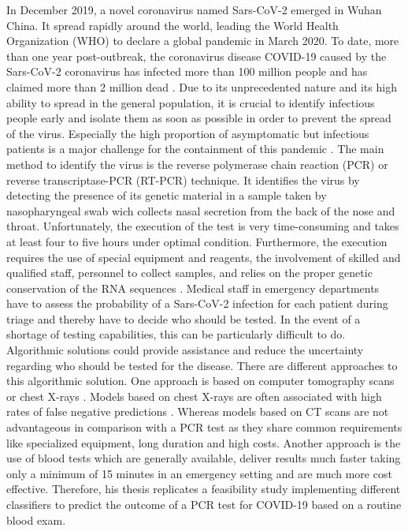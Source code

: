 In December 2019, a novel coronavirus named Sars-CoV-2 emerged in Wuhan China. 
It spread rapidly around the world, leading the World Health Organization (WHO) 
to declare a global pandemic in March 2020. To date, more than one year 
post-outbreak, the coronavirus disease COVID-19 caused by the Sars-CoV-2 
coronavirus has infected more than 100 million people and has claimed more than 
2 million dead \cite{RN204}. Due to its unprecedented nature and its high 
ability to spread in the general population, it is crucial to identify 
infectious people early and isolate them as soon as possible in order to 
prevent the spread of the virus. Especially the high proportion of asymptomatic 
but infectious patients is a major challenge for the containment of this 
pandemic \cite{RN205}. The main method to identify the virus is the reverse 
polymerase chain reaction (PCR) or reverse transcriptase-PCR (RT-PCR) 
technique. It identifies the virus by detecting the presence of its genetic 
material in a sample taken by nasopharyngeal swab wich collects nasal 
secretion from the back of the nose and throat. Unfortunately, the execution of 
the test is very time-consuming and takes at least four to five hours under 
optimal condition. 
Furthermore, the execution requires the use of special equipment and reagents, 
the involvement of skilled and qualified staff, personnel to collect samples, 
and relies on the proper genetic conservation of the RNA sequences 
\cite{RN201, RN202}.
Medical staff in emergency departments have to assess the probability of a 
Sars-CoV-2 infection for each patient during triage and thereby have to decide 
who should be tested. In the event of a shortage of testing capabilities, this 
can be particularly difficult to do. Algorithmic solutions could provide 
assistance and reduce the uncertainty regarding who should be tested for the 
disease. There are different approaches to this algorithmic solution.
One approach is based on computer tomography scans or chest X-rays 
\cite{RN200}. Models based on chest X-rays are often associated with high rates 
of false negative predictions \cite{RN200, RN206}. Whereas models based on CT 
scans are not advantageous in comparison with a PCR test as they share common 
requirements like specialized equipment, long duration and high costs.
Another approach is the use of blood tests which are generally available, 
deliver results much faster taking only a minimum of 15 minutes in an emergency 
setting and are much more cost effective.
Therefore, his thesis replicates a feasibility study implementing different 
classifiers to predict the outcome of a PCR test for COVID-19 based on a 
routine blood exam.
